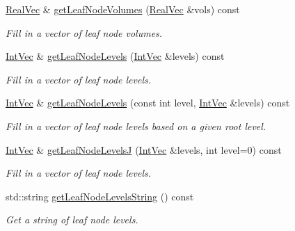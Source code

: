 \begin{DoxyCompactItemize}
\hyperlink{namespacesubpavings_af2d57bb6e12f4a73169f2e496d6a641f}{\-Real\-Vec} \& \hyperlink{classsubpavings_1_1SPnode_a5fe9e24f8f5cfe76e6b4a2f5ccc1f6f5}{get\-Leaf\-Node\-Volumes} (\hyperlink{namespacesubpavings_af2d57bb6e12f4a73169f2e496d6a641f}{\-Real\-Vec} \&vols) const 
\begin{DoxyCompactList}\small\item\em \-Fill in a vector of leaf node volumes. \end{DoxyCompactList}\item 
\hyperlink{namespacesubpavings_aed8e75b2af342b9c1460431c223dca8e}{\-Int\-Vec} \& \hyperlink{classsubpavings_1_1SPnode_aa1df5c8572870d22d59c852b458c892b}{get\-Leaf\-Node\-Levels} (\hyperlink{namespacesubpavings_aed8e75b2af342b9c1460431c223dca8e}{\-Int\-Vec} \&levels) const 
\begin{DoxyCompactList}\small\item\em \-Fill in a vector of leaf node levels. \end{DoxyCompactList}\item 
\hyperlink{namespacesubpavings_aed8e75b2af342b9c1460431c223dca8e}{\-Int\-Vec} \& \hyperlink{classsubpavings_1_1SPnode_ab2d91d997064dccc3c1a6f80bd27c6ef}{get\-Leaf\-Node\-Levels} (const int level, \hyperlink{namespacesubpavings_aed8e75b2af342b9c1460431c223dca8e}{\-Int\-Vec} \&levels) const 
\begin{DoxyCompactList}\small\item\em \-Fill in a vector of leaf node levels based on a given root level. \end{DoxyCompactList}\item 
\hyperlink{namespacesubpavings_aed8e75b2af342b9c1460431c223dca8e}{\-Int\-Vec} \& \hyperlink{classsubpavings_1_1SPnode_a2e0b22fea0d547f34660cd9870b34ae7}{get\-Leaf\-Node\-Levels\-J} (\hyperlink{namespacesubpavings_aed8e75b2af342b9c1460431c223dca8e}{\-Int\-Vec} \&levels, int level=0) const 
\begin{DoxyCompactList}\small\item\em \-Fill in a vector of leaf node levels. \end{DoxyCompactList}\item 
std\-::string \hyperlink{classsubpavings_1_1SPnode_a7ea8cd3649cbf13d5743d3cb23315d72}{get\-Leaf\-Node\-Levels\-String} () const 
\begin{DoxyCompactList}\small\item\em \-Get a string of leaf node levels. \end{DoxyCompactList}\item 

\end{DoxyCompactItemize}
